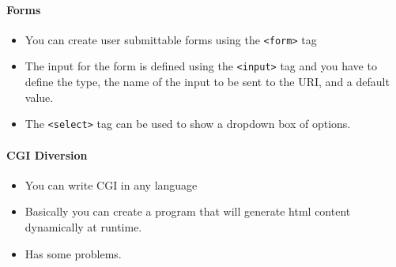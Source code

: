 \documentclass[../CMPUT-404-Notes.tex]{subfiles}
\begin{document}
\paragraph{Forms}
\begin{itemize}
  \item You can create user submittable forms using the \texttt{<form>} tag 
  \item The input for the form is defined using the \texttt{<input>} tag and you have to define the type, the name of the input to be sent to the URI, and a default value.
  \item The \texttt{<select>} tag can be used to show a dropdown box of options.
\end{itemize}
\paragraph{CGI Diversion}
\begin{itemize}
  \item You can write CGI in any language 
  \item Basically you can create a program that will generate html content dynamically at runtime. 
  \item Has some problems.
\end{itemize}
\end{document}
